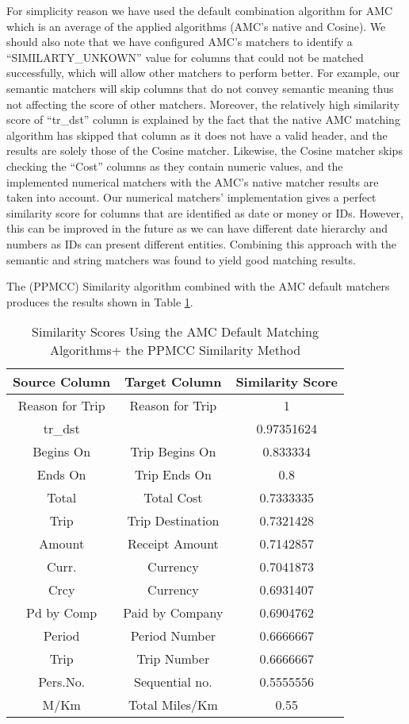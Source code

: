For simplicity reason we have used the default combination algorithm for AMC which is an average of the applied algorithms (AMC's native and Cosine). We should also note that we have configured AMC's matchers to identify a ``SIMILARTY\_UNKOWN'' value for columns that could not be matched successfully, which will allow other matchers to perform better. For example, our semantic matchers will skip columns that do not convey semantic meaning thus not affecting the score of other matchers. Moreover, the relatively high similarity score of ``tr\_dst'' column is explained by the fact that the native AMC matching algorithm has skipped that column as it does not have a valid header, and the results are solely those of the Cosine matcher. Likewise, the Cosine matcher skips checking the ``Cost'' columns as they contain numeric values, and the implemented numerical matchers with the AMC's native matcher results are taken into account. Our numerical matchers' implementation gives a perfect similarity score for columns that are identified as date or money or IDs. However, this can be improved in the future as we can have different date hierarchy and numbers as IDs can present different entities. Combining this approach with the semantic and string matchers was found to yield good matching results.

The (PPMCC) Similarity algorithm combined with the AMC default matchers produces the results shown in Table \ref{tab:Similarity_Scores_Using_the_AMC_Default_Matching_Algorithms+__the_PPMCC_Similarity_Method}.

\begin{table}[ht]
\centering
\begin{tabular}{|c|c|c|}\hline
\textbf{Source Column} & \textbf{Target Column} & \textbf{Similarity Score} \\ \hline
Reason for Trip & Reason for Trip & 1 \\ \hline
tr\_dst &  & 0.97351624 \\ \hline
Begins On & Trip Begins On & 0.833334 \\ \hline
Ends On & Trip Ends On & 0.8 \\ \hline
Total & Total Cost & 0.7333335 \\ \hline
Trip & Trip Destination & 0.7321428 \\ \hline
Amount & Receipt Amount & 0.7142857 \\ \hline
Curr. & Currency & 0.7041873 \\ \hline
Crcy & Currency & 0.6931407 \\ \hline
Pd by Comp & Paid by Company & 0.6904762 \\ \hline
Period & Period Number & 0.6666667 \\ \hline
Trip & Trip Number & 0.6666667 \\ \hline
Pers.No. & Sequential no. & 0.5555556 \\ \hline
M/Km & Total Miles/Km & 0.55 \\ \hline
\end{tabular}
\caption{Similarity Scores Using the AMC Default Matching Algorithms+  the PPMCC Similarity Method}
\label{tab:Similarity_Scores_Using_the_AMC_Default_Matching_Algorithms+__the_PPMCC_Similarity_Method}
\end{table}


